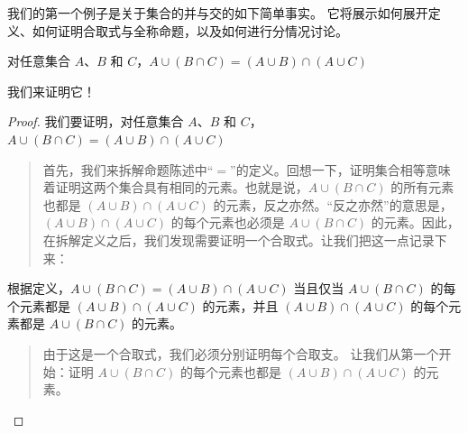 \documentclass[../../../include/open-logic-section]{subfiles}
\begin{document}


我们的第一个例子是关于集合的并与交的如下简单事实。
它将展示如何展开定义、如何证明合取式与全称命题，以及如何进行分情况讨论。


\begin{prop}
对任意集合 $A$、$B$ 和 $C$，$A \cup (B \cap C) = (A \cup B)
\cap (A \cup C)$
\end{prop}


我们来证明它！{}

\begin{proof}
我们要证明，对任意集合 $A$、$B$ 和 $C$，$A \cup (B \cap
C) = (A \cup B) \cap (A \cup C)$
\begin{quote}
首先，我们来拆解命题陈述中“$=$”的定义。回想一下，证明集合相等意味着证明这两个集合具有相同的元素。也就是说，$A \cup
(B \cap C)$ 的所有元素也都是 $(A \cup B) \cap (A \cup C)$ 的元素，反之亦然。“反之亦然”的意思是，$(A
\cup B) \cap (A \cup C)$ 的每个元素也必须是 $A \cup (B \cap
C)$ 的元素。因此，在拆解定义之后，我们发现需要证明一个合取式。让我们把这一点记录下来：
\end{quote}
根据定义，$A \cup (B \cap C) = (A \cup B) \cap (A \cup C)$ 当且仅当
$A \cup (B \cap C)$ 的每个元素都是 $(A
\cup B) \cap (A \cup C)$ 的元素，并且 $(A \cup B) \cap (A
\cup C)$ 的每个元素都是 $A \cup (B \cap C)$ 的元素。
\begin{quote}
由于这是一个合取式，我们必须分别证明每个合取支。
让我们从第一个开始：证明 $A \cup (B \cap C)$ 的每个元素也都是 $(A
\cup B) \cap (A \cup C)$ 的元素。


\end{quote}
\end{proof}
\end{document}
